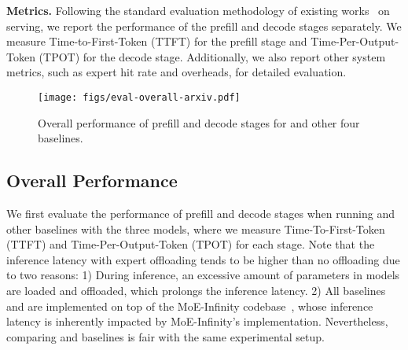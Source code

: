 \noindent \textbf{Metrics.}
Following the standard evaluation methodology of existing works~\cite{song2024promoe,xue2024moe,zhong2024distserve,agrawal2024taming} on \LLM serving, we report the performance of the prefill and decode stages separately. 
We measure Time-to-First-Token (TTFT) for the prefill stage and Time-Per-Output-Token (TPOT) for the decode stage.
Additionally, we also report other system metrics, such as expert hit rate and overheads, for detailed evaluation.




\begin{figure}[t]
  \centering
  \texttt{[image: figs/eval-overall-arxiv.pdf]}
  \vspace{-0.15in}
  \caption{Overall performance of prefill and decode stages for \sys and other four baselines.}
  \vspace{-0.2in}
  \label{fig:eval-overall}
\end{figure}


\subsection{Overall Performance}
\label{subsec:eval-overall}



We first evaluate the performance of prefill and decode stages when running \sys and other baselines with the three \MoE models, where we measure Time-To-First-Token (TTFT) and Time-Per-Output-Token (TPOT) for each stage.
Note that the inference latency with expert offloading tends to be higher than no offloading due to two reasons: 
1) During inference, an excessive amount of parameters in \MoE models are loaded and offloaded, which prolongs the inference latency.
2) All baselines and \sys are implemented on top of the MoE-Infinity codebase~\cite{moe-infinity-code}, whose inference latency is inherently impacted by MoE-Infinity's implementation.
Nevertheless, comparing \sys and baselines is fair with the same experimental setup.

